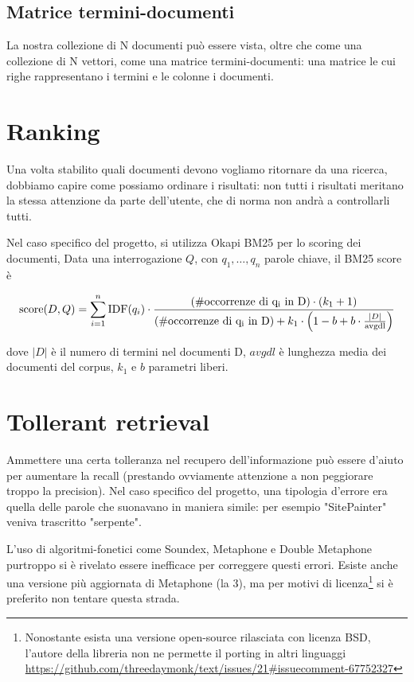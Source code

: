 \subsection{Matrice termini-documenti}
La nostra collezione di N documenti può essere vista, oltre che come una collezione di N vettori, come una matrice termini-documenti: una matrice le cui righe rappresentano i termini e le colonne i documenti.


\section{Ranking}
Una volta stabilito quali documenti devono vogliamo ritornare da una ricerca, dobbiamo capire come possiamo ordinare i risultati: non tutti i risultati meritano la stessa attenzione da parte dell'utente, che di norma non andrà a controllarli tutti.

Nel caso specifico del progetto, si utilizza Okapi BM25 per lo scoring dei documenti,
Data una interrogazione $Q$, con $q_1, \dots , q_n$ parole chiave, il BM25 score è 

\begin{equation}
    \text{score}(D,Q) = \sum_{i=1}^{n} \text{IDF}(q_i) \cdot \frac{\text{(\#occorrenze di q\textsubscript{i} in D)} \cdot (k_1 + 1)}{\text{(\#occorrenze di q\textsubscript{i} in D)} + k_1 \cdot \left(1 - b + b \cdot \frac{|D|}{\text{avgdl}}\right)}
\end{equation}

dove $|D|$ è il numero di termini nel documenti D, $avgdl$ è lunghezza media dei documenti del corpus, $k_1$ e $b$ parametri liberi.

\section{Tollerant retrieval}
Ammettere una certa tolleranza nel recupero dell’informazione può essere d’aiuto per aumentare la recall (prestando ovviamente attenzione a non peggiorare troppo la precision). Nel caso specifico del progetto, una tipologia d'errore era quella delle parole che suonavano in maniera simile: per esempio "SitePainter" veniva trascritto "serpente".

L’uso di \gls{algoritmi-fonetici} come Soundex, Metaphone e Double Metaphone purtroppo si è rivelato essere inefficace per correggere questi errori. Esiste anche una versione più aggiornata di Metaphone (la 3), ma per motivi di licenza\footnote{Nonostante esista una versione open-source rilasciata con licenza BSD, l'autore della libreria non ne permette il porting in altri linguaggi \url{https://github.com/threedaymonk/text/issues/21\#issuecomment-67752327}} si è preferito non tentare questa strada.

